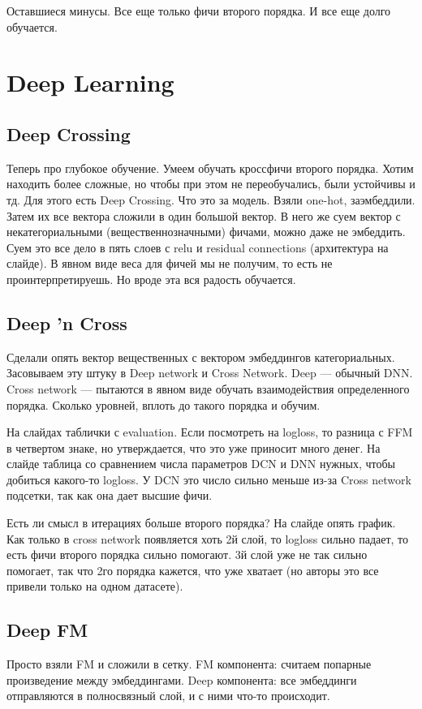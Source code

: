 Оставшиеся минусы. Все еще только фичи второго порядка. И все еще долго обучается.

\section{Deep Learning}
\subsection{Deep Crossing} 

Теперь про глубокое обучение. Умеем обучать кроссфичи второго порядка. Хотим находить более сложные, но чтобы при этом не переобучались, были устойчивы и тд. Для этого есть Deep Crossing. Что это за модель. Взяли one-hot, заэмбеддили. Затем их все вектора сложили в один большой вектор. В него же суем вектор с некатегориальными (вещественнозначными) фичами, можно даже не эмбеддить. Суем это все дело в пять слоев с relu и residual connections (архитектура на слайде). В явном виде веса для фичей мы не получим, то есть не проинтерпретируешь. Но вроде эта вся радость обучается. 

\subsection{Deep 'n Cross} 

Сделали опять вектор вещественных с вектором эмбеддингов категориальных. Засовываем эту штуку в Deep network и Cross Network. Deep --- обычный DNN. Cross network --- пытаются в явном виде обучать взаимодействия определенного порядка. Сколько уровней, вплоть до такого порядка и обучим.

На слайдах таблички с evaluation. Если посмотреть на logloss, то разница с FFM в четвертом знаке, но утверждается, что это уже приносит много денег. На слайде таблица со сравнением числа параметров DCN и DNN нужных, чтобы добиться какого-то logloss. У DCN это число сильно меньше из-за Cross network подсетки, так как она дает высшие фичи.

Есть ли смысл в итерациях больше второго порядка? На слайде опять график. Как только в cross network появляется хоть 2й слой, то logloss сильно падает, то есть фичи второго порядка сильно помогают. 3й слой уже не так сильно помогает, так что 2го порядка кажется, что уже хватает (но авторы это все привели только на одном датасете).

\subsection{Deep FM}

Просто взяли FM и сложили в сетку. FM компонента: считаем попарные произведение между эмбеддингами. Deep компонента: все эмбеддинги отправляются в полносвязный слой, и с ними что-то происходит. 

